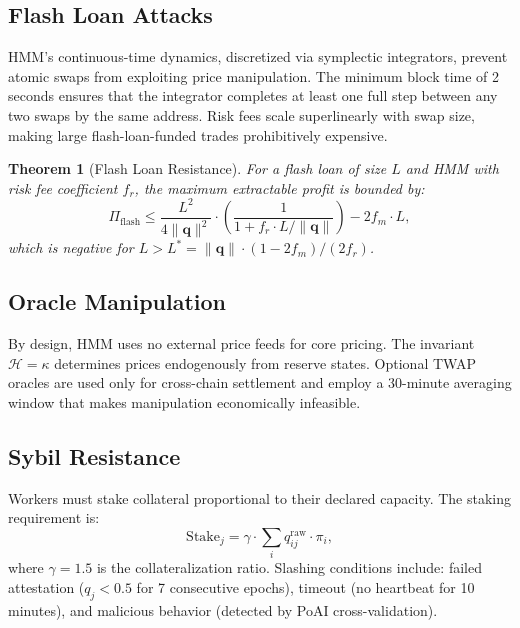 \documentclass[11pt,twocolumn]{article}
\newtheorem{theorem}{Theorem}
\begin{document}
\subsection{Flash Loan Attacks}

HMM's continuous-time dynamics, discretized via symplectic integrators, prevent atomic swaps from exploiting price manipulation. The minimum block time of 2 seconds ensures that the integrator completes at least one full step between any two swaps by the same address. Risk fees scale superlinearly with swap size, making large flash-loan-funded trades prohibitively expensive.

\begin{theorem}[Flash Loan Resistance]
For a flash loan of size $L$ and HMM with risk fee coefficient $f_r$, the maximum extractable profit is bounded by:
\begin{equation}
\Pi_{\text{flash}} \le \frac{L^2}{4\|\bm{q}\|^2} \cdot \left(\frac{1}{1 + f_r \cdot L/\|\bm{q}\|}\right) - 2f_m \cdot L,
\end{equation}
which is negative for $L > L^* = \|\bm{q}\| \cdot (1 - 2f_m)/(2f_r)$.
\end{theorem}

\subsection{Oracle Manipulation}

By design, HMM uses no external price feeds for core pricing. The invariant $\mathcal{H} = \kappa$ determines prices endogenously from reserve states. Optional TWAP oracles are used only for cross-chain settlement and employ a 30-minute averaging window that makes manipulation economically infeasible.

\subsection{Sybil Resistance}

Workers must stake collateral proportional to their declared capacity. The staking requirement is:
\begin{equation}
\text{Stake}_j = \gamma \cdot \sum_i q_{ij}^{\text{raw}} \cdot \pi_i,
\end{equation}
where $\gamma = 1.5$ is the collateralization ratio. Slashing conditions include: failed attestation ($q_j < 0.5$ for 7 consecutive epochs), timeout (no heartbeat for 10 minutes), and malicious behavior (detected by PoAI cross-validation).
\end{document}
